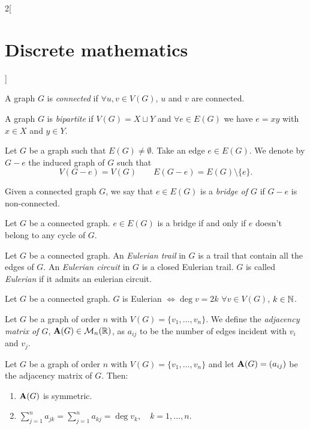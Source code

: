 \documentclass[../../../main.tex]{subfiles}
\begin{document}
\begin{multicols}{2}[\section{Discrete mathematics}]
\begin{prop}
\end{prop}
\begin{definition}
A graph $G$ is \textit{connected} if $\forall u,v\in V(G)$, $u$ and $v$ are connected.
\end{definition}
\begin{definition}
A graph $G$ is \textit{bipartite} if $V(G)=X\sqcup Y$ and $\forall e\in E(G)$ we have $e=xy$ with $x\in X$ and $y\in Y$.
\end{definition}
\begin{definition}
Let $G$ be a graph such that $E(G)\ne\emptyset$. Take an edge $e\in E(G)$. We denote by $G-e$ the induced graph of $G$ such that $$V(G-e)=V(G)\qquad E(G-e)=E(G)\setminus\{e\}.$$
\end{definition}
\begin{definition}
Given a connected graph $G$, we say that $e\in E(G)$ is a \textit{bridge of $G$} if $G-e$ is non-connected.
\end{definition}
\begin{prop}
Let $G$ be a connected graph. $e\in E(G)$ is a bridge if and only if $e$ doesn't belong to any cycle of $G$.
\end{prop}
\begin{definition}
Let $G$ be a connected graph. An \textit{Eulerian trail} in $G$ is a trail that contain all the edges of $G$. An \textit{Eulerian circuit} in $G$ is a closed Eulerian trail. $G$ is called \textit{Eulerian} if it admits an eulerian circuit.
\end{definition}
\begin{theorem}
Let $G$ be a connected graph. $G$ is Eulerian $\iff\deg v=2k$ $\forall v\in V(G)$, $k\in\mathbb{N} $.
\end{theorem}
\begin{definition}
Let $G$ be a graph of order $n$ with $V(G)=\{v_1,\ldots,v_n\}$. We define the \textit{adjacency matrix of $G$}, $\vb{A}(G)\in\mathcal{M}_n(\mathbb{R} )$, as $a_{ij}$ to be the number of edges incident with $v_i$ and $v_j$.
\end{definition}
\begin{prop}
Let $G$ be a graph of order $n$ with $V(G)=\{v_1,\ldots,v_n\}$ and let $\vb{A}(G)=(a_{ij})$ be the adjacency matrix of $G$. Then:
\begin{enumerate}
    \item $\vb{A}(G)$ is symmetric.
    \item $\displaystyle\sum_{j=1}^n a_{jk}=\sum_{j=1}^n a_{kj}=\deg v_k,\quad k=1,\ldots,n$.

\end{enumerate}
\end{prop}
\end{multicols}
\end{document}
